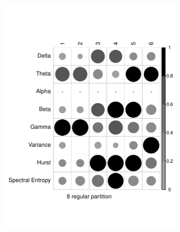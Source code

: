 \begin{figure}[h]
  \begin{subfigure}[b]{0.45\textwidth}
      \includegraphics[width = \linewidth, keepaspectratio]{./figs/eeg-vec-corrplot.pdf}%
  \end{subfigure} 
  \hfill
  \begin{subfigure}[b]{0.45\textwidth}

\end{subfigure}
\end{figure}
